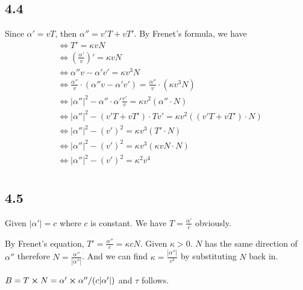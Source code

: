 \documentclass[12pt]{article}
\begin{document}
\subsection*{4.4}
Since $\alpha' = v T$,  then $\alpha'' = v'T + vT'$. By Frenet's formula, we have 
$$\begin{aligned}
&\Leftrightarrow T' = \kappa v N \\
  &\Leftrightarrow \left(\frac{\alpha'}{v}\right)' = \kappa v N \\
  &\Leftrightarrow \alpha''v - \alpha' v' = \kappa v^3 N \\
  &\Leftrightarrow \frac{\alpha''}{v}\cdot \left(\alpha''v - \alpha' v' \right) =  \frac{\alpha''}{v}\cdot (\kappa v^3 N) \\
  &\Leftrightarrow |\alpha''|^2 - \alpha'' \cdot \alpha' \frac{v'}{v} = \kappa v^2 (\alpha'' \cdot N)  \\
  &\Leftrightarrow |\alpha''|^2 - (v'T + vT')\cdot T v' = \kappa v^2 ((v'T + vT')\cdot N) \\
  &\Leftrightarrow |\alpha''|^2 - (v')^2 = \kappa v^3 (T'\cdot N) \\
  &\Leftrightarrow |\alpha''|^2 - (v')^2 = \kappa v^3 (\kappa v N \cdot N) \\
  &\Leftrightarrow |\alpha''|^2 - (v')^2 = \kappa^2 v^4 \\
\end{aligned}$$
\QED

\subsection*{4.5}
Given $|\alpha'| = c$ where $c$ is constant. We have  $T = \frac{\alpha'}{c}$ obviously. 

By Frenet's equation, $T'= \frac{\alpha''}{c} = \kappa c N $. Given $\kappa > 0$. $N$ has the same direction of $\alpha''$ 
therefore $N = \frac{\alpha''}{|\alpha''|}$.  And we can find $\kappa = \frac{|\alpha''|}{c^2}$ by substituting $N$ back in.

$B = T \cross N = \alpha' \cross \alpha'' / (c |\alpha'|)$ and $\tau$ follows.
\end{document}

